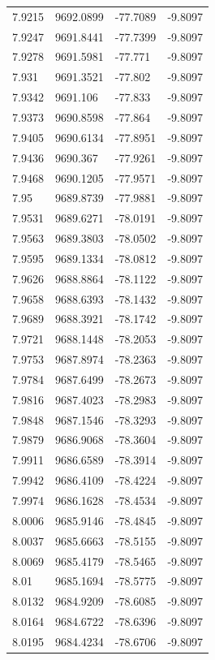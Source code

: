 \begin{table}[H]
\begin{tabular}{llll}
7.9215 & 9692.0899 & -77.7089 & -9.8097 \\
7.9247 & 9691.8441 & -77.7399 & -9.8097 \\
7.9278 & 9691.5981 & -77.771 & -9.8097 \\
7.931 & 9691.3521 & -77.802 & -9.8097 \\
7.9342 & 9691.106 & -77.833 & -9.8097 \\
7.9373 & 9690.8598 & -77.864 & -9.8097 \\
7.9405 & 9690.6134 & -77.8951 & -9.8097 \\
7.9436 & 9690.367 & -77.9261 & -9.8097 \\
7.9468 & 9690.1205 & -77.9571 & -9.8097 \\
7.95 & 9689.8739 & -77.9881 & -9.8097 \\
7.9531 & 9689.6271 & -78.0191 & -9.8097 \\
7.9563 & 9689.3803 & -78.0502 & -9.8097 \\
7.9595 & 9689.1334 & -78.0812 & -9.8097 \\
7.9626 & 9688.8864 & -78.1122 & -9.8097 \\
7.9658 & 9688.6393 & -78.1432 & -9.8097 \\
7.9689 & 9688.3921 & -78.1742 & -9.8097 \\
7.9721 & 9688.1448 & -78.2053 & -9.8097 \\
7.9753 & 9687.8974 & -78.2363 & -9.8097 \\
7.9784 & 9687.6499 & -78.2673 & -9.8097 \\
7.9816 & 9687.4023 & -78.2983 & -9.8097 \\
7.9848 & 9687.1546 & -78.3293 & -9.8097 \\
7.9879 & 9686.9068 & -78.3604 & -9.8097 \\
7.9911 & 9686.6589 & -78.3914 & -9.8097 \\
7.9942 & 9686.4109 & -78.4224 & -9.8097 \\
7.9974 & 9686.1628 & -78.4534 & -9.8097 \\
8.0006 & 9685.9146 & -78.4845 & -9.8097 \\
8.0037 & 9685.6663 & -78.5155 & -9.8097 \\
8.0069 & 9685.4179 & -78.5465 & -9.8097 \\
8.01 & 9685.1694 & -78.5775 & -9.8097 \\
8.0132 & 9684.9209 & -78.6085 & -9.8097 \\
8.0164 & 9684.6722 & -78.6396 & -9.8097 \\
8.0195 & 9684.4234 & -78.6706 & -9.8097 \\

\end{tabular}
\end{table}
